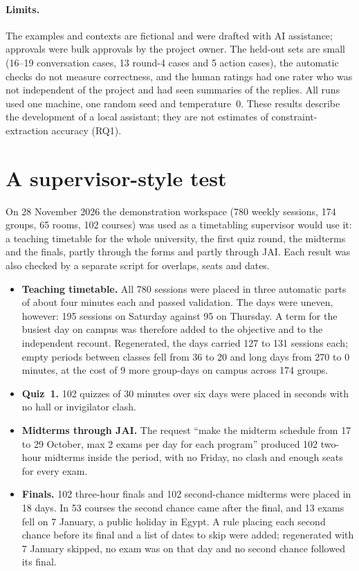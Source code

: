 \paragraph{Limits.} The examples and contexts are fictional and were drafted with AI assistance; approvals were bulk approvals by the project owner. The held-out sets are small (16--19 conversation cases, 13 round-4 cases and 5 action cases), the automatic checks do not measure correctness, and the human ratings had one rater who was not independent of the project and had seen summaries of the replies. All runs used one machine, one random seed and temperature~0. These results describe the development of a local assistant; they are not estimates of constraint-extraction accuracy (RQ1).

\section{A supervisor-style test}\label{evidence-supervisor}
On 28 November 2026 the demonstration workspace (780 weekly sessions, 174 groups, 65 rooms, 102 courses) was used as a timetabling supervisor would use it: a teaching timetable for the whole university, the first quiz round, the midterms and the finals, partly through the forms and partly through JAI. Each result was also checked by a separate script for overlaps, seats and dates.

\begin{itemize}
\tightlist
\item \textbf{Teaching timetable.} All 780 sessions were placed in three automatic parts of about four minutes each and passed validation. The days were uneven, however: 195 sessions on Saturday against 95 on Thursday. A term for the busiest day on campus was therefore added to the objective and to the independent recount. Regenerated, the days carried 127 to 131 sessions each; empty periods between classes fell from 36 to 20 and long days from 270 to 0 minutes, at the cost of 9 more group-days on campus across 174 groups.
\item \textbf{Quiz~1.} 102 quizzes of 30 minutes over six days were placed in seconds with no hall or invigilator clash.
\item \textbf{Midterms through JAI.} The request ``make the midterm schedule from 17 to 29 October, max 2 exams per day for each program'' produced 102 two-hour midterms inside the period, with no Friday, no clash and enough seats for every exam.
\item \textbf{Finals.} 102 three-hour finals and 102 second-chance midterms were placed in 18 days. In 53 courses the second chance came after the final, and 13 exams fell on 7 January, a public holiday in Egypt. A rule placing each second chance before its final and a list of dates to skip were added; regenerated with 7 January skipped, no exam was on that day and no second chance followed its final.
\end{itemize}

